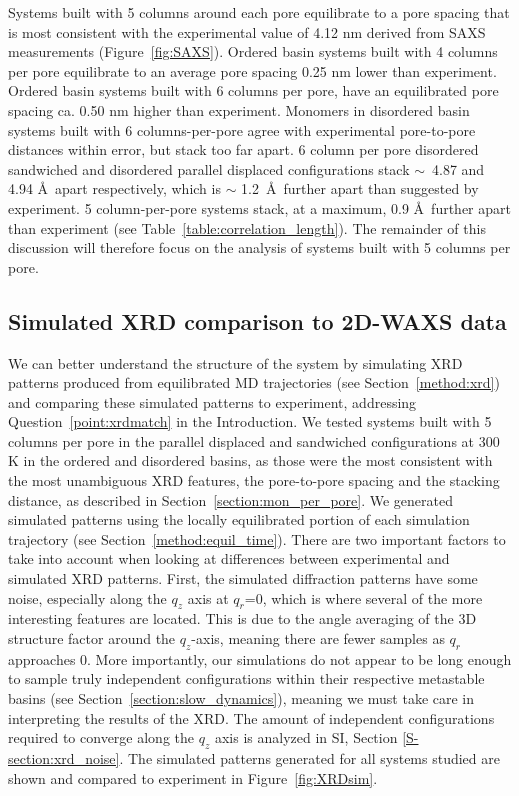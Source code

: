 \documentclass[journal=jpcbfk,manuscript=article]{achemso}
\begin{document}
  Systems built with 5 columns around each pore equilibrate to a pore spacing
  that is most consistent with the experimental value of 4.12 nm derived from
  SAXS measurements (Figure~\ref{fig:SAXS}). Ordered basin systems built with 4
  columns per pore equilibrate to an average pore spacing 0.25 nm lower than
  experiment. Ordered basin systems built with 6 columns per pore, have an
  equilibrated pore spacing ca. 0.50 nm higher than experiment. Monomers in
  disordered basin systems built with 6 columns-per-pore agree with experimental
  pore-to-pore distances within error, but stack too far apart. 6
  column per pore disordered sandwiched and disordered parallel displaced
  configurations stack $\sim$~4.87 and 4.94 \AA~apart respectively, which is
  $\sim$ 1.2~\AA~further apart than suggested by experiment. 5 column-per-pore
  systems stack, at a maximum, 0.9 \AA~further apart than experiment (see
  Table~\ref{table:correlation_length}). The remainder of this discussion will
  therefore focus on the analysis of systems built with 5 columns per pore. 

  \subsection{Simulated XRD comparison to 2D-WAXS data}

  We can better understand the structure of the system by simulating XRD
  patterns produced from equilibrated MD trajectories (see
  Section~\ref{method:xrd}) and comparing these simulated patterns to experiment,
  addressing Question~\ref{point:xrdmatch} in the Introduction. We tested systems
  built with 5 columns per pore in the parallel displaced and sandwiched
  configurations at 300 K in the ordered and disordered basins, as those were the
  most consistent with the most unambiguous XRD features, the pore-to-pore
  spacing and the stacking distance, as described in
  Section~\ref{section:mon_per_pore}.  We generated simulated patterns using the
  locally equilibrated portion of each simulation trajectory (see
  Section~\ref{method:equil_time}). There are two important factors to take into
  account when looking at differences between experimental and simulated XRD
  patterns.  First, the simulated diffraction patterns have some noise,
  especially along the $q_z$ axis at $q_r$=0, which is where several of the more
  interesting features are located. This is due to the angle averaging of the 3D
  structure factor around the $q_z$-axis, meaning there are fewer samples as
  $q_r$ approaches 0.  More importantly, our simulations do not appear to be long
  enough to sample truly independent configurations within their respective
  metastable basins (see Section~\ref{section:slow_dynamics}), meaning we must
  take care in interpreting the results of the XRD. The amount of independent
  configurations required to converge along the $q_z$ axis is analyzed in SI,
  Section \ref{S-section:xrd_noise}. The simulated patterns generated for all
  systems studied are shown and compared to experiment in
  Figure~\ref{fig:XRDsim}.
\end{document}
